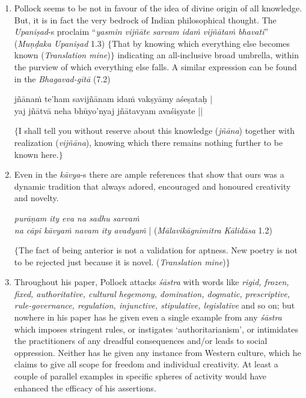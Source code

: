 \begin{enumerate}
\item Pollock seems to be not in favour of the idea of divine origin of all knowledge. But, it is in fact the very bedrock of Indian philosophical thought. The {\it Upaniṣad}-s proclaim ``\textsl{yasmin vijñāte sarvam idaṁ vijñātaṁ bhavati}'' (\textsl{Muṇḍaka Upaniṣad} 1.3) $\{$That by knowing which everything else becomes known (\textsl{Translation mine})$\}$ indicating an all-inclusive broad umbrella, within the purview of which everything else falls. A similar expression can be found in the \textsl{Bhagavad-gītā} (7.2)
\begin{myquote}
jñānaṁ te'ham savijñānam idaṁ vakṣyāmy aśeṣataḥ |\\
yaj jñātvā neha bhūyo'nyaj jñātavyam avaśiṣyate ||
\end{myquote}
$\{$I shall tell you without reserve about this knowledge ({\it jñāna}) together with realization ({\it vijñāna}), knowing which there remains nothing further to be known here.$\}$

\item Even in the {\it kāvya}-s there are ample references that show that ours was a dynamic tradition that always adored, encouraged and honoured creativity and novelty.
\begin{myquote}
\textsl{purāṇam ity eva na sadhu sarvaṁ}\\
\textsl{na cāpi kāvyaṁ navam ity avadyaṁ} | (\textsl{Mālavikāgnimitra Kālidāsa}  1.2)
\end{myquote}
$\{$The fact of being anterior is not a validation for aptness. New poetry is not to be rejected just because it is novel. (\textsl{Translation mine})$\}$

\item Throughout his paper, Pollock attacks {\it śāstra} with words like \textsl{rigid, frozen, fixed, authoritative, cultural hegemony, domination, dogmatic, prescriptive, rule-governance, regulation, injunctive, stipulative, legislative} and so on; but nowhere in his paper has he given even a single example from any {\it śāstra} which imposes stringent rules, or instigates `authoritarianism', or intimidates the practitioners of any dreadful consequences and/or leads to social oppression. Neither has he given any instance from Western culture, which he claims to give all scope for freedom and individual creativity. At least a couple of parallel examples in specific spheres of activity would have enhanced the efficacy of his assertions.


\end{enumerate}
